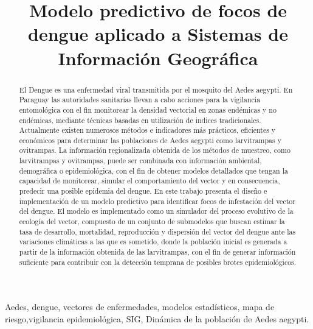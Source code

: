 \documentclass[conference]{IEEEtran}
\begin{document}
%
\title{Modelo predictivo de focos de dengue aplicado a Sistemas de Información Geográfica}


\author{
}
\maketitle

\begin{abstract}
El Dengue es una enfermedad viral transmitida por el mosquito del Aedes aegypti. En Paraguay las autoridades sanitarias llevan a cabo acciones para la vigilancia entomológica con el fin monitorear la densidad vectorial en zonas endémicas y no endémicas, mediante técnicas basadas en utilización de indices tradicionales. Actualmente existen numerosos métodos e indicadores más prácticos, eficientes y económicos para determinar las poblaciones de Aedes aegypti como larvitrampas y ovitrampas. La información regionalizada obtenida de los métodos de muestreo, como larvitrampas y ovitrampas, puede ser combinada con información ambiental, demográfica o epidemiológica, con el fin de obtener modelos detallados que tengan la capacidad de monitorear, simular el comportamiento del vector y en consecuencia, predecir una posible epidemia del dengue. En este trabajo presenta el diseño e implementación de un modelo predictivo para identificar focos de infestación del vector del dengue. El modelo es implementado como un simulador del proceso evolutivo de la ecología del vector, compuesto de un conjunto de submodelos que buscan estimar la tasa de desarrollo, mortalidad, reproducción y dispersión del vector del dengue ante las variaciones climáticas a las que es sometido, donde la población inicial es generada a partir de la información obtenida de las larvitrampas, con el fin de generar información suficiente para contribuir con la detección temprana de posibles brotes epidemiológicos.
\end{abstract}

\begin{IEEEkeywords}
Aedes, dengue, vectores de enfermedades, modelos estadísticos, mapa de riesgo,vigilancia  epidemiológica, SIG, Dinámica de la población de Aedes aegypti.
\end{IEEEkeywords}

\IEEEpeerreviewmaketitle






\printbibliography

\end{document}
